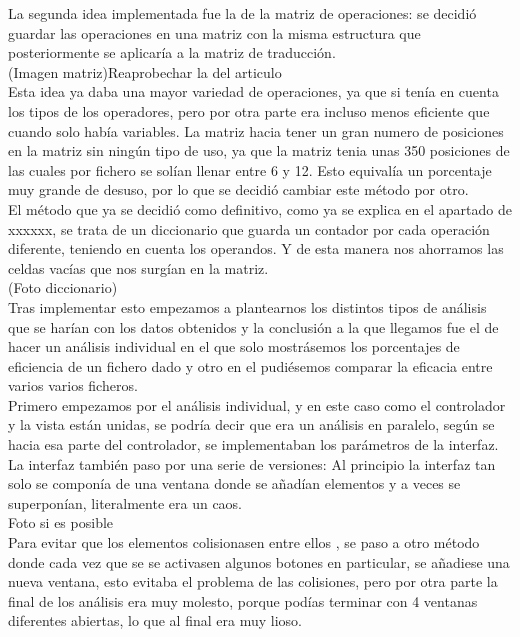 La segunda idea implementada fue la de la  matriz de operaciones: se decidió guardar las operaciones en una matriz con la misma estructura que posteriormente se aplicaría a la matriz de traducción.\\
(Imagen matriz)Reaprobechar la del articulo\\
Esta idea ya daba una mayor variedad de operaciones, ya que si tenía en cuenta los tipos de los operadores, pero por otra parte era incluso menos eficiente que cuando solo había variables. La matriz hacia tener un gran numero de posiciones en la matriz sin ningún tipo de uso, ya que la matriz tenia unas 350 posiciones de las cuales por fichero se solían llenar entre 6 y 12. Esto equivalía un porcentaje muy grande de desuso, por lo que se decidió cambiar este método por otro.\\
El método que ya se decidió como definitivo, como ya se explica en el apartado de  xxxxxx, se trata de  un diccionario que guarda un contador por cada operación diferente, teniendo en cuenta los operandos. Y de esta manera nos ahorramos las celdas vacías que nos surgían en la matriz.\\
(Foto diccionario)\\
Tras implementar esto empezamos a plantearnos los distintos tipos de análisis que se harían con los datos obtenidos y la conclusión a la que llegamos fue el  de hacer un análisis individual en el que solo mostrásemos los porcentajes de eficiencia de un fichero dado y otro en el pudiésemos comparar la eficacia entre varios varios ficheros.\\
Primero  empezamos por el análisis individual, y en este caso como el controlador y la vista están unidas, se podría  decir que era un análisis en paralelo, según se hacia esa parte del controlador, se implementaban los parámetros de la interfaz.\\
La interfaz también paso por una serie de versiones:
 Al principio la interfaz tan solo se componía de una ventana donde se añadían elementos  y a veces se  superponían, literalmente era un caos.\\
 
Foto si es posible\\

Para evitar que los elementos colisionasen entre ellos , se paso a otro  método donde cada vez que se se activasen algunos botones en particular, se añadiese una nueva ventana, esto  evitaba el problema de las colisiones, pero por otra parte la final de los análisis era muy molesto, porque  podías terminar con 4 ventanas diferentes abiertas, lo que al final era muy lioso.\\


